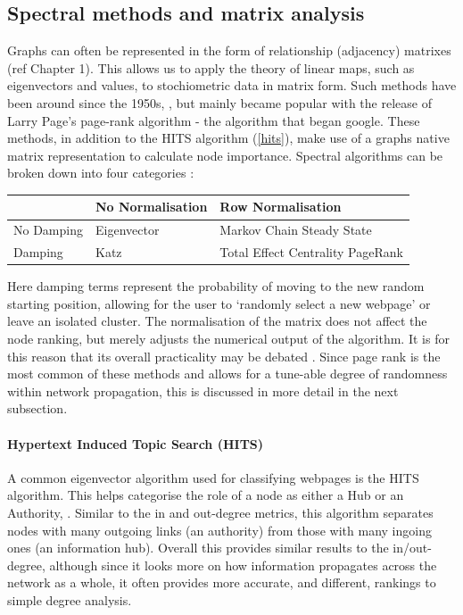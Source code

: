 % 
% 
% 
\subsection{Spectral methods and matrix analysis}

Graphs can often be represented in the form of relationship (adjacency) matrixes (ref Chapter 1). This allows us to apply the theory of linear maps, such as eigenvectors and values, to stochiometric data in matrix form. Such methods have been around since the 1950s, \citep{seeley}, but mainly became popular with the release of Larry Page's page-rank algorithm \citep{google} - the algorithm that began google. These methods, in addition to the HITS algorithm (\autoref{hits}), make use of a graphs native matrix representation to calculate node importance. Spectral algorithms can be broken down into four categories \citep{spectral}:

\begin{table}[H]
  \centering
\begin{tabular}{p{}||p{} p{}}
\hline
 & No Normalisation  & Row Normalisation \\
 \hline \hline
No Damping & Eigenvector \citep{eigen, eigen2}  \: & Markov Chain Steady State \citep{seeley} \: \\
Damping & Katz \citep{katz} \: & Total Effect Centrality PageRank \citep{google} \\ \hline
\end{tabular}
\end{table}


Here damping terms represent the probability of moving to the new random starting position, allowing for the user to `randomly select a new webpage' or leave an isolated cluster. The normalisation of the matrix does not affect the node ranking, but merely adjusts the numerical output of the algorithm. It is for this reason that its overall practicality may be debated \citep{spectral}. Since page rank is the most common of these methods and allows for a tune-able degree of randomness within network propagation, this is discussed in more detail in the next subsection.


    
    \paragraph*{Hypertext Induced Topic Search (HITS)}\label{hits}
    A common eigenvector algorithm used for classifying webpages is the 
    HITS algorithm. This helps categorise the role of a node as either a Hub or an Authority,
     \citep{hits,hitsvspagerank,hitsweb}. Similar to the in and out-degree metrics, this algorithm separates nodes with many outgoing links (an authority) from those with many ingoing ones (an information hub). Overall this provides similar results to the in/out-degree, although since it looks more on how information propagates across the network as a whole, it often provides more accurate, and different, rankings to simple degree analysis.  
     
